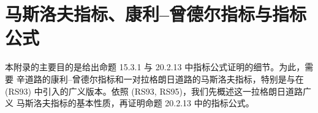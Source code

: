 \chapter{马斯洛夫指标、康利--曾德尔指标与指标公式}
\label{app:index-formula}
\appendixsectionstatements

本附录的主要目的是给出命题 15.3.1 与 20.2.13 中指标公式证明的细节。为此，需要
辛道路的康利--曾德尔指标和一对拉格朗日道路的马斯洛夫指标，特别是\personRobbin{}与\personSalamon{}在 (RS93)
中引入的广义版本。依照 (RS93, RS95)，我们先概述这一拉格朗日道路广义
马斯洛夫指标的基本性质，再证明命题 20.2.13 中的指标公式。





